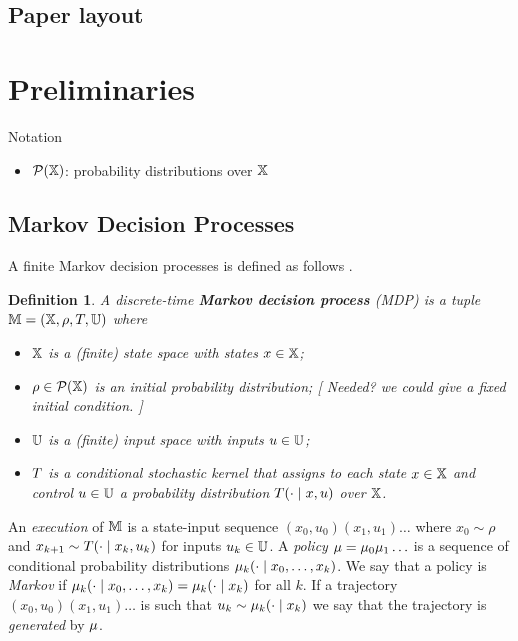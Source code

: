 \documentclass[conference]{IEEEtran}
\newtheorem{definition}{Definition}
\newcommand{\sofie}[1]{{\color{orange}[ #1 ]}}
\begin{document}
\subsection{Paper layout}

\section{Preliminaries}

Notation

\begin{itemize}
  \item $\mathcal P(\mathbb{X})$: probability distributions over $\mathbb{X}$
\end{itemize}

\subsection{Markov Decision Processes}

A finite Markov decision processes is defined as follows \cite{hll1996}.
\begin{definition}
\label{def:MDP}
  A discrete-time \textbf{Markov decision process} (MDP) is a tuple $\mathbb{M} = (\mathbb{X}, \rho, T, \mathbb{U})$ where
  \begin{itemize}
    \item $\mathbb{X}$ is a (finite) state space with states $x\in\mathbb{X}$; %
    \item $\rho \in \mathcal P(\mathbb{X})$ is an initial probability distribution; \sofie{Needed? we could give a fixed initial condition.}
    \item $\mathbb{U}$ is a (finite) input space with inputs $u\in\mathbb{U}$;
    \item $T$ is a conditional stochastic kernel that assigns to each state $x\in \mathbb{X}$ and control $u\in \mathbb{U}$ a probability distribution $T(\cdot\mid x,u)$ over $\mathbb{X}$.
  \end{itemize}
\end{definition}

An \emph{execution} of $\mathbb{M}$ is a state-input sequence $(x_0, u_0)(x_1, u_1)\ldots$ where $x_0 \sim \rho$ and $x_{k+1} \sim T(\cdot \mid x_k, u_k)$ for inputs $u_k \in \mathbb{U}$. A \emph{policy} $\mu = \mu_0 \mu_1 \ldots$ is a sequence of conditional probability distributions $\mu_k( \cdot \mid x_0, \ldots, x_{k})$. We say that a policy is \emph{Markov} if $\mu_k( \cdot \mid x_0, \ldots, x_{k}) = \mu_k( \cdot \mid x_{k})$ for all $k$. If a trajectory $(x_0, u_0)(x_1, u_1)\ldots$ is such that $u_k \sim \mu_k ( \cdot \mid x_{k})$ we say that the trajectory is \emph{generated} by $\mu$.
\end{document}
